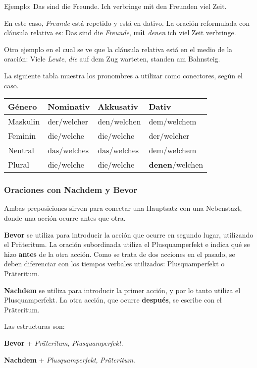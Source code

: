 Ejemplo: Das sind die Freunde. Ich verbringe mit den Freunden viel Zeit. 

En este caso, \textit{Freunde} está repetido y está en dativo. La oración reformulada con cláusula relativa es: Das sind die \textit{Freunde}, \textbf{mit} \textit{denen} ich viel Zeit verbringe.

Otro ejemplo en el cual se ve que la cláusula relativa está en el medio de la oración: Viele \textit{Leute}, \textit{die} auf dem Zug warteten, standen am Bahnsteig.


La siguiente tabla muestra los pronombres a utilizar como conectores, según el caso.

\begin{tabular}{| l | l | l | l |}
\hline
\textbf{Género} & \textbf{Nominativ} & \textbf{Akkusativ} & \textbf{Dativ}\\
\hline
Maskulin & der/welcher & den/welchen & dem/welchem  \\
Feminin  & die/welche  & die/welche  & der/welcher \\
Neutral  & das/welches & das/welches & dem/welchem \\
Plural   & die/welche  & die/welche  & \textbf{denen}/welchen \\
\hline
\end{tabular}

\subsubsection{Oraciones con Nachdem y Bevor}
Ambas preposiciones sirven para conectar una Hauptsatz con una Nebenstazt, donde una acción ocurre antes que otra. 

\textbf{Bevor} se utiliza para introducir la acción que ocurre en segundo lugar, utilizando el Präteritum. La oración subordinada utiliza el Plusquamperfekt e indica qué se hizo \textbf{antes} de la otra acción. Como se trata de dos acciones en el pasado, se deben diferenciar con los tiempos verbales utilizados: Plusquamperfekt o Präteritum.

\textbf{Nachdem} se utiliza para introducir la primer acción, y por lo tanto utiliza el Plusquamperfekt. La otra acción, que ocurre \textbf{después}, se escribe con el Präteritum.

Las estructuras son:

\textbf{Bevor} + \textit{Präteritum}, \textit{Plusquamperfekt}.

\textbf{Nachdem} + \textit{Plusquamperfekt}, \textit{Präteritum}.

